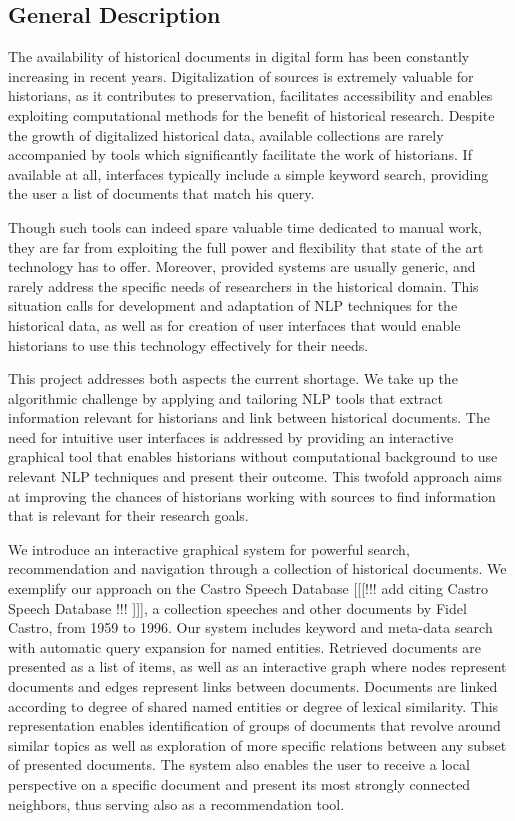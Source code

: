 

\subsection{General Description}
\label{sec:general_description}
The availability of historical documents in digital form has been constantly increasing in recent years. Digitalization of sources is extremely valuable for historians, as it contributes to preservation, facilitates accessibility and enables exploiting computational methods for the benefit of historical research. Despite the growth of digitalized historical data, available collections are rarely accompanied by tools which significantly facilitate the work of historians. If available at all,  interfaces typically include a simple keyword search, providing the user a list of documents that match his query. 

Though such tools can indeed spare valuable time dedicated to manual work, they are far from exploiting the full power and flexibility that state of the art technology has to offer. Moreover, provided systems are usually generic, and rarely address the specific needs of researchers in the historical domain. This situation calls for development and adaptation of NLP techniques for the historical data, as well as for creation of user interfaces that would enable historians to use this technology effectively for their needs. 

This project addresses both aspects the current shortage. We take up the algorithmic challenge by applying and tailoring NLP tools that extract information relevant for historians and link between historical documents. The need for intuitive user interfaces is addressed by providing an interactive graphical tool that enables historians without computational background to use relevant NLP techniques and present their outcome. This twofold approach aims at improving the chances of historians working with sources to find information that is relevant for their research goals.

We introduce an interactive graphical system for powerful search, recommendation and navigation through a collection of historical documents. We exemplify our approach on the Castro Speech Database [[[!!! add citing Castro Speech Database !!! ]]], a collection speeches and other documents by Fidel Castro, from 1959 to 1996. Our system includes keyword and meta-data search with automatic query expansion for named entities. Retrieved documents are presented as a list of items, as well as an interactive graph where nodes represent documents and edges represent links between documents. Documents are linked according to degree of shared named entities or degree of lexical similarity. This representation enables identification of groups of documents that revolve around similar topics as well as exploration of more specific relations between any subset of presented documents. The system also enables the user to receive a local perspective on a specific document and present its most strongly connected neighbors, thus serving also as a recommendation tool. 

